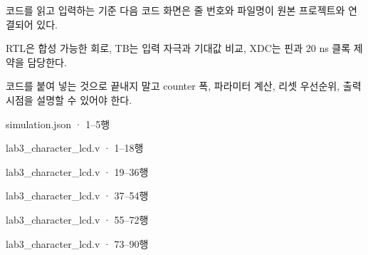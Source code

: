 \begin{frame}[label=code]{코드를 읽고 입력하는 기준}
\small
다음 코드 화면은 줄 번호와 파일명이 원본 프로젝트와 연결되어 있다.\par\vspace{0.25cm}
RTL은 합성 가능한 회로, TB는 입력 자극과 기대값 비교, XDC는 핀과 20 ns 클록 제약을 담당한다.\par\vspace{0.25cm}
코드를 붙여 넣는 것으로 끝내지 말고 counter 폭, 파라미터 계산, 리셋 우선순위, 출력 시점을 설명할 수 있어야 한다.
\end{frame}

\begin{frame}[fragile]{simulation.json · 1–5행}

\end{frame}

\begin{frame}[fragile]{lab3\_character\_lcd.v · 1–18행}

\end{frame}

\begin{frame}[fragile]{lab3\_character\_lcd.v · 19–36행}

\end{frame}

\begin{frame}[fragile]{lab3\_character\_lcd.v · 37–54행}

\end{frame}

\begin{frame}[fragile]{lab3\_character\_lcd.v · 55–72행}

\end{frame}

\begin{frame}[fragile]{lab3\_character\_lcd.v · 73–90행}

\end{frame}


